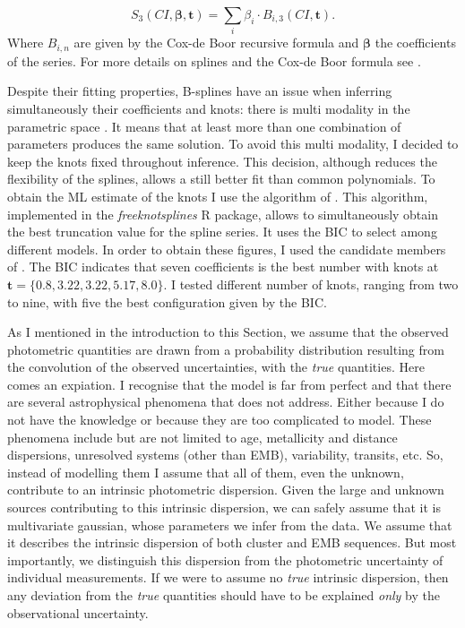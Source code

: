 \begin{equation}
S_3(CI,\boldsymbol{\beta},\mathbf{t}) = \sum_i \beta_i\cdot B_{i,3}(CI,\mathbf{t}).
\end{equation}
Where $B_{i,n}$ are given by the Cox-de Boor recursive formula and $\boldsymbol{\beta}$ the coefficients of the series. For more details on splines and the Cox-de Boor formula see \citet{deBoor1978}.



Despite their fitting properties, B-splines have an issue when inferring simultaneously their coefficients and knots: there is multi modality in the parametric space \citep{Lindstrom1999}. It means that at least more than one combination of parameters produces the same solution. To avoid this multi modality, I decided to keep the knots fixed throughout inference. This decision, although reduces the flexibility of the splines, allows a still better fit than common polynomials. To obtain the ML estimate of the knots I use the algorithm of  \citet{Spiriti2013}. This algorithm, implemented in the \emph{freeknotsplines} R package, allows to simultaneously obtain the best truncation value for the spline series. It uses the BIC to select among different models. In order to obtain these figures, I used the candidate members of \citet{Bouy2015}. The BIC indicates that seven coefficients is the best number with knots at $\mathbf{t}=\{0.8,3.22,3.22,5.17,8.0\}$. I tested different number of knots, ranging from two to nine, with five the best configuration given by the BIC. 

As I mentioned in the introduction to this Section, we assume that the observed photometric quantities are drawn from a probability distribution resulting from the convolution of the observed uncertainties, with the \emph{true} quantities. Here comes an expiation. I recognise that the model is far from perfect and that there are several astrophysical phenomena that does not address. Either because I do not have the knowledge or because they are too complicated to model. These phenomena include but are not limited to age, metallicity and distance dispersions, unresolved systems (other than EMB), variability, transits, etc. So, instead of modelling them I assume that all of them, even the unknown, contribute to an intrinsic photometric dispersion. Given the large and unknown sources contributing to this intrinsic dispersion, we can safely assume that it is multivariate gaussian, whose parameters we infer from the data.
We assume that it describes the intrinsic dispersion of both cluster and EMB sequences. But most importantly, we distinguish this dispersion from the photometric uncertainty of individual measurements. If we were to assume no \emph{true} intrinsic dispersion, then any deviation from the \emph{true} quantities should have to be explained \emph{only} by the observational uncertainty. 


